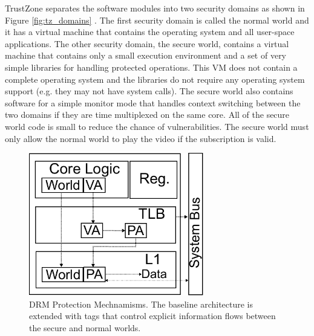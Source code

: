     TrustZone separates the software modules into two security domains as shown 
    in Figure \ref{fig:tz_domains} . The first security domain is called the 
    normal world and it has a virtual machine that contains the operating 
    system and all user-space applications. The other security domain, the 
    secure world, contains a virtual machine that contains only a small 
    execution environment and a set of very simple libraries for handling 
    protected operations. This VM does not contain a complete operating system 
    and the libraries do not require any operating system support (e.g. they 
    may not have system calls). The secure world also contains software for a 
    simple monitor mode that handles context switching between the two domains 
    if they are time multiplexed on the same core. All of the secure world code 
    is small to reduce the chance of vulnerabilities. The secure world must 
    only allow the normal world to play the video if the subscription is valid.


    \begin{figure}
        \begin{center}
            \includegraphics[width=3in]{figs/tz_tags.pdf}
            \caption{DRM Protection Mechnamisms. The baseline architecture 
            is extended with tags that control explicit information flows 
        between the secure and normal worlds.}
            \label{fig:baseline}
        \end{center}
    \end{figure}


